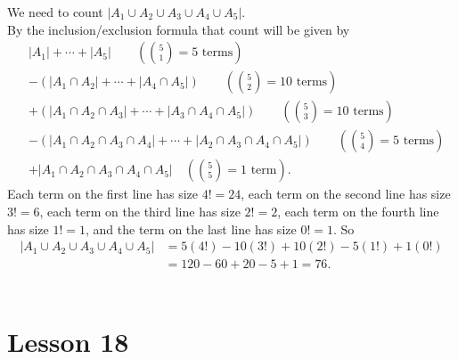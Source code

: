 \documentclass[11pt]{amsart}
\begin{document}
\begin{enumerate}
{\color{blue}
We need to count $|A_{1}\cup A_{2}\cup A_{3}\cup A_{4}\cup A_{5}|$.\\
By the inclusion/exclusion formula that count will be given by\\
\begin{align*}
&|A_{1}| + \cdots  +|A_{5}|\qquad \left(\binom{5}{1} = 5 \text{ terms}\right)\\   
& - (|A_{1}\cap A_{2}| +\cdots + |A_{4}\cap A_{5}|) \qquad  \left(\binom{5}{2} = 10 \text{ terms}\right)\\   
& + (|A_{1}\cap A_{2}\cap A_{3}| +\cdots +  |A_{3}\cap A_{4}\cap A_{5}|) \qquad  \left(\binom{5}{3} =10 \text{ terms}\right)\\ 
& - (|A_{1}\cap A_{2}\cap A_{3}\cap A_{4}| +\cdots + |A_{2}\cap A_{3}\cap A_{4}\cap A_{5}|) \qquad  \left(\binom{5}{4} =5 \text{ terms}\right)\\  
&+|A_{1}\cap A_{2}\cap A_{3}\cap A_{4}\cap A_{5}| \quad  \left(\binom{5}{5} =1 \text{ term}\right).
\end{align*}
Each term on the first line has size $4!= 24$, each term on the second line has size $3! = 6$, each term
on the third line has size $2! = 2$, each term on the fourth line has size $1! = 1$, and the  term on the last line
has size $0! = 1$. So
\begin{align*}
|A_{1}\cup A_{2}\cup A_{3}\cup A_{4}\cup A_{5}| &= 5(4!) - 10(3!) + 10(2!) - 5(1!) + 1(0!)\\
& = 120 - 60 + 20 -5 + 1 = 76.
\end{align*}\\[5pt]
}


\end{enumerate}

\section{Lesson 18}
\end{document}
